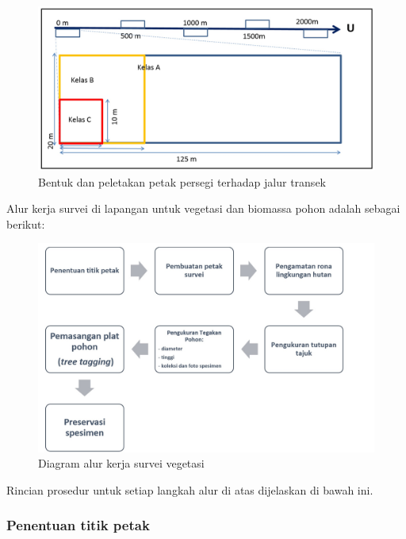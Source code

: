 \documentclass[
  oneside]{book}
\begin{document}
\begin{figure}

{\centering \includegraphics[width=1\linewidth]{images/pv_ilustration} 

}

\caption{Bentuk dan peletakan petak persegi terhadap jalur transek}\label{fig:figpv}
\end{figure}

Alur kerja survei di lapangan untuk vegetasi dan biomassa pohon adalah sebagai berikut:

\begin{figure}

{\centering \includegraphics[width=1\linewidth]{images/av_ilustration} 

}

\caption{Diagram alur kerja survei vegetasi}\label{fig:figav}
\end{figure}

Rincian prosedur untuk setiap langkah alur di atas dijelaskan di bawah ini.

\hypertarget{penentuan-titik-petak}{%
\subsubsection*{Penentuan titik petak}\label{penentuan-titik-petak}}
\end{document}
